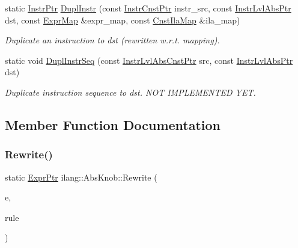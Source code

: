\begin{DoxyCompactItemize}
\mbox{\label{classilang_1_1_abs_knob_af6fabf9c5a66d7dc989925cdb3e46488}} 
static \mbox{\hyperlink{namespaceilang_af88a19312ae653d687a0d1207bb284f6}{Instr\+Ptr}} \mbox{\hyperlink{classilang_1_1_abs_knob_af6fabf9c5a66d7dc989925cdb3e46488}{Dupl\+Instr}} (const \mbox{\hyperlink{namespaceilang_a13249a9b1d22eb3454730a7903be4364}{Instr\+Cnst\+Ptr}} instr\+\_\+src, const \mbox{\hyperlink{namespaceilang_ad1b30fdf347e493b3937143da05d1a72}{Instr\+Lvl\+Abs\+Ptr}} dst, const \mbox{\hyperlink{namespaceilang_ad40e6475e04844bcad9c380aac0b215c}{Expr\+Map}} \&expr\+\_\+map, const \mbox{\hyperlink{namespaceilang_a4e780d7b16cb21d2c10f955c504e7356}{Cnst\+Ila\+Map}} \&ila\+\_\+map)
\begin{DoxyCompactList}\small\item\em Duplicate an instruction to dst (rewritten w.\+r.\+t. mapping). \end{DoxyCompactList}\item 
\mbox{\label{classilang_1_1_abs_knob_a22f24b532333429e27c1e5e7f8e6badd}} 
static void \mbox{\hyperlink{classilang_1_1_abs_knob_a22f24b532333429e27c1e5e7f8e6badd}{Dupl\+Instr\+Seq}} (const \mbox{\hyperlink{namespaceilang_adc86156b73aa1a4b6369645e9b96ff19}{Instr\+Lvl\+Abs\+Cnst\+Ptr}} src, const \mbox{\hyperlink{namespaceilang_ad1b30fdf347e493b3937143da05d1a72}{Instr\+Lvl\+Abs\+Ptr}} dst)
\begin{DoxyCompactList}\small\item\em Duplicate instruction sequence to dst. N\+OT I\+M\+P\+L\+E\+M\+E\+N\+T\+ED Y\+ET. \end{DoxyCompactList}\end{DoxyCompactItemize}


\subsection{Member Function Documentation}
\mbox{\label{classilang_1_1_abs_knob_a6668c30b9010fe929b24fcadb9232493}} 
\subsubsection{\texorpdfstring{Rewrite()}{Rewrite()}}
{\footnotesize\ttfamily static \mbox{\hyperlink{namespaceilang_a7c4196c72e53ea4df4b7861af7bc3bce}{Expr\+Ptr}} ilang\+::\+Abs\+Knob\+::\+Rewrite (\begin{DoxyParamCaption}\item[{const \mbox{\hyperlink{namespaceilang_a7c4196c72e53ea4df4b7861af7bc3bce}{Expr\+Ptr}}}]{e,  }\item[{const \mbox{\hyperlink{namespaceilang_ad40e6475e04844bcad9c380aac0b215c}{Expr\+Map}} \&}]{rule }\end{DoxyParamCaption})\hspace{0.3cm}{\ttfamily [static]}}



